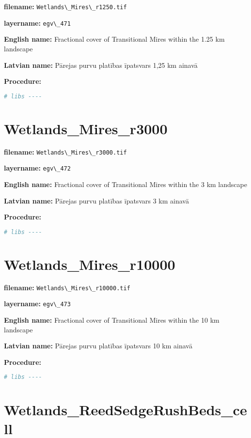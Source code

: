 \documentclass[
]{book}
\newcommand{\passthrough}[1]{#1}
\begin{document}
\textbf{filename:} \passthrough{\lstinline!Wetlands\_Mires\_r1250.tif!}

\textbf{layername:} \passthrough{\lstinline!egv\_471!}

\textbf{English name:} Fractional cover of Transitional Mires within the 1.25 km landscape

\textbf{Latvian name:} Pārejas purvu platības īpatsvars 1,25 km ainavā

\textbf{Procedure:}

\begin{lstlisting}[language=R]
# libs ----
\end{lstlisting}

\section{Wetlands\_Mires\_r3000}\label{ch06.472}

\textbf{filename:} \passthrough{\lstinline!Wetlands\_Mires\_r3000.tif!}

\textbf{layername:} \passthrough{\lstinline!egv\_472!}

\textbf{English name:} Fractional cover of Transitional Mires within the 3 km landscape

\textbf{Latvian name:} Pārejas purvu platības īpatsvars 3 km ainavā

\textbf{Procedure:}

\begin{lstlisting}[language=R]
# libs ----
\end{lstlisting}

\section{Wetlands\_Mires\_r10000}\label{ch06.473}

\textbf{filename:} \passthrough{\lstinline!Wetlands\_Mires\_r10000.tif!}

\textbf{layername:} \passthrough{\lstinline!egv\_473!}

\textbf{English name:} Fractional cover of Transitional Mires within the 10 km landscape

\textbf{Latvian name:} Pārejas purvu platības īpatsvars 10 km ainavā

\textbf{Procedure:}

\begin{lstlisting}[language=R]
# libs ----
\end{lstlisting}

\section{Wetlands\_ReedSedgeRushBeds\_cell}\label{ch06.474}
\end{document}
